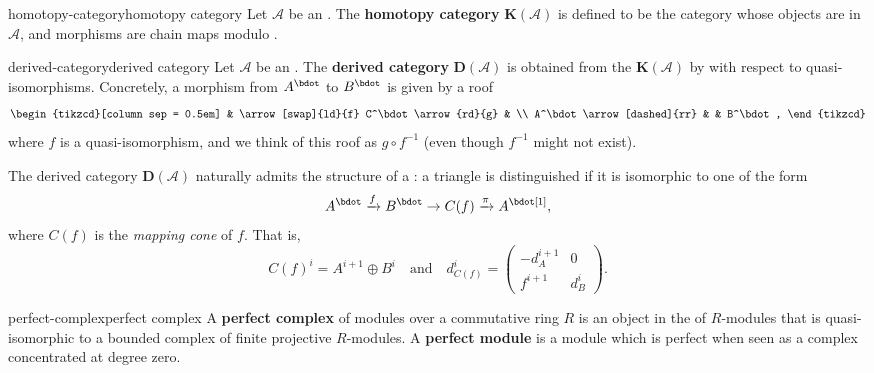 \begin{topic}{homotopy-category}{homotopy category}
    Let $\mathcal{A}$ be an . The \textbf{homotopy category} $\textbf{K}(\mathcal{A})$ is defined to be the category whose objects are  in $\mathcal{A}$, and morphisms are chain maps modulo .
\end{topic}

\begin{topic}{derived-category}{derived category}
    Let $\mathcal{A}$ be an . The \textbf{derived category} $\textbf{D}(\mathcal{A})$ is obtained from the  $\textbf{K}(\mathcal{A})$ by  with respect to quasi-isomorphisms. Concretely, a morphism from $A^\bdot$ to $B^\bdot$ is given by a roof
    \[ \begin{tikzcd}[column sep = 0.5em] & \arrow[swap]{ld}{f} C^\bdot \arrow{rd}{g} & \\ A^\bdot \arrow[dashed]{rr} & & B^\bdot , \end{tikzcd} \]
    where $f$ is a quasi-isomorphism, and we think of this roof as $g \circ f^{-1}$ (even though $f^{-1}$ might not exist).
    
    The derived category $\textbf{D}(\mathcal{A})$ naturally admits the structure of a : a triangle is distinguished if it is isomorphic to one of the form
    \[ A^\bdot \xrightarrow{f} B^\bdot \to C(f) \xrightarrow{\pi} A^\bdot[1] , \]
    where $C(f)$ is the \textit{mapping cone} of $f$. That is,
    \[ C(f)^i = A^{i + 1} \oplus B^i \quad \text{and} \quad d_{C(f)}^i = \begin{pmatrix} -d_A^{i + 1} & 0 \\ f^{i + 1} & d_B^i \end{pmatrix} . \]
\end{topic}

    

\begin{topic}{perfect-complex}{perfect complex}
    A \textbf{perfect complex} of modules over a commutative ring $R$ is an object in the  of $R$-modules that is quasi-isomorphic to a bounded complex of finite projective $R$-modules. A \textbf{perfect module} is a module which is perfect when seen as a complex concentrated at degree zero.
\end{topic}
